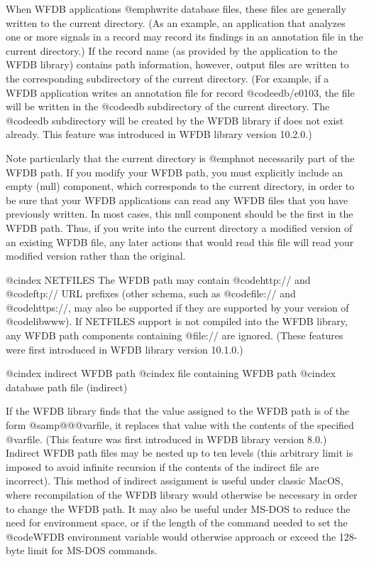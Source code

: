 {{When WFDB applications @emph{write} database files, these files are
generally written to the current directory.  (As an example, an
application that analyzes one or more signals in a record may record its
findings in an annotation file in the current directory.)  If the record
name (as provided by the application to the WFDB library) contains path
information, however, output files are written to the corresponding
subdirectory of the current directory.  (For example, if a WFDB
application writes an annotation file for record @code{edb/e0103}, the
file will be written in the @code{edb} subdirectory of the current
directory.  The @code{edb} subdirectory will be created by the WFDB
library if does not exist already.  This feature was introduced in WFDB
library version 10.2.0.)

Note particularly that the current directory is @emph{not} necessarily
part of the WFDB path.  If you modify your WFDB path, you must
explicitly include an empty (null) component, which corresponds to the
current directory, in order to be sure that your WFDB applications can
read any WFDB files that you have previously written.  In most cases,
this null component should be the first in the WFDB path.  Thus, if you
write into the current directory a modified version of an existing WFDB
file, any later actions that would read this file will read your
modified version rather than the original.

@cindex NETFILES
The WFDB path may contain @code{http://} and @code{ftp://} URL prefixes
(other schema, such as @code{file://} and @code{https://}, may also be
supported if they are supported by your version of @code{libwww}).  If
NETFILES support is not compiled into the WFDB library, any WFDB
path components containing @file{://} are ignored.  (These features were
first introduced in WFDB library version 10.1.0.)

@cindex indirect WFDB path
@cindex file containing WFDB path
@cindex database path file (indirect)

If the WFDB library finds that the value assigned to the WFDB path is of the
form @samp{@@@var{file}}, it replaces that value with the contents of
the specified @var{file}.  (This feature was first introduced in WFDB
library version 8.0.)  Indirect WFDB path files may be nested up to ten
levels (this arbitrary limit is imposed to avoid infinite recursion if
the contents of the indirect file are incorrect).  This method of
indirect assignment is useful under classic MacOS, where recompilation of
the WFDB library would otherwise be necessary in order to change the WFDB
path.  It may also be useful under MS-DOS to reduce the need for
environment space, or if the length of the command needed to set the
@code{WFDB} environment variable would otherwise approach or exceed the
128-byte limit for MS-DOS commands.

}}
